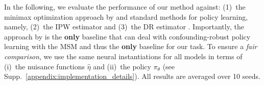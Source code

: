 \documentclass{article} %
\theoremstyle{plain}
\theoremstyle{definition}
\theoremstyle{remark}
\begin{document}
In the following, we evaluate the performance of our method against: (1)~the minimax optimization approach by \citet{Kallus.2018c, Kallus.2021d} and standard methods for policy learning, namely, (2)~the IPW estimator \citep{Swaminathan.2015}  and (3)~the DR estimator \citep{Athey.2021,Dudik.2011}. Importantly, the approach by  \citet{Kallus.2018c, Kallus.2021d} is the \textbf{only} baseline that can deal with confounding-robust policy learning with the MSM and thus the \textbf{only} baseline for our task. To ensure a \emph{fair comparison}, we use the same neural instantiations for all models in terms of (i)~the nuisance functions $\hat{\eta}$ and (ii)~the policy $\pi_\theta$ (see Supp.~\ref{appendix:implementation_details}). All results are averaged over 10 seeds.

\end{document}
